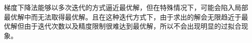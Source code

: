 \documentclass[12pt]{article}
\begin{document}
\begin{figure}[H]
    \centering
\end{figure}
梯度下降法能够以多次迭代的方式逼近最优解，但在特殊情况下，可能会陷入局部最优解中而无法取得最优解。且在这种迭代方式下，由于求出的解会无限趋近于最优解但由于迭代次数以及精度限制很难达到最优解，所以不会出现明显的过拟合现象。
\end{document}
